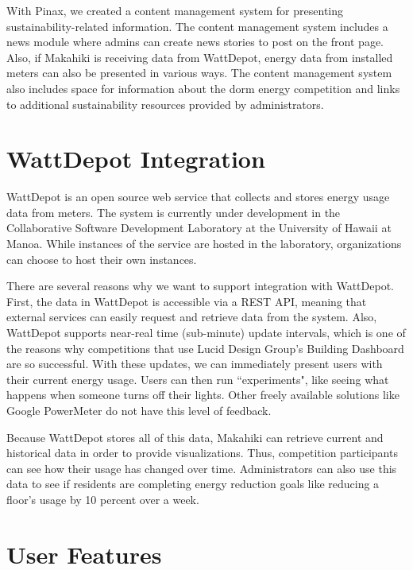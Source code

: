 With Pinax, we created a content management system for presenting sustainability-related information.  The content management system includes a news module where admins can create news stories to post on the front page.  Also, if Makahiki is receiving data from WattDepot, energy data from installed meters can also be presented in various ways. The content management system also includes space for information about the dorm energy competition and links to additional sustainability resources provided by administrators.

\section{WattDepot Integration}
\label{wattdepot}

WattDepot is an open source web service that collects and stores energy usage data from meters.  The system is currently under development in the Collaborative Software Development Laboratory at the University of Hawaii at Manoa.  While instances of the service are hosted in the laboratory, organizations can choose to host their own instances.

There are several reasons why we want to support integration with WattDepot.  First, the data in WattDepot is accessible via a REST API\cite{wattdepot-rest}, meaning that external services can easily request and retrieve data from the system.  Also, WattDepot supports near-real time (sub-minute) update intervals, which is one of the reasons why competitions that use Lucid Design Group's Building Dashboard are so successful.  With these updates, we can immediately present users with their current energy usage.  Users can then run ``experiments", like seeing what happens when someone turns off their lights.  Other freely available solutions like Google PowerMeter\cite{google-powermeter} do not have this level of feedback.

Because WattDepot stores all of this data, Makahiki can retrieve current and historical data in order to provide visualizations.  Thus, competition participants can see how their usage has changed over time.  Administrators can also use this data to see if residents are completing energy reduction goals like reducing a floor's usage by 10 percent over a week.

\section{User Features}
\label{user}

